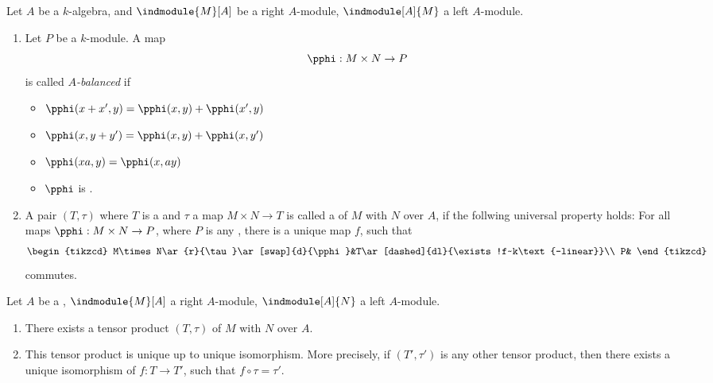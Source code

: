 \begin{defn}
  Let $A$ be a $k$-algebra, and $\indmodule{M}[A]$ be a right $A$-module, $\indmodule[A]{M}$ a left $A$-module.
  \begin{enumerate}
    \item Let $P$ be a $k$-module. A map
    \[
    \pphi: M\times N\to P
    \]
    is called \emph{$A$-balanced}  if
    \begin{itemize}
      \item $\pphi(x+x',y)=\pphi(x,y)+\pphi(x',y)$
      \item $\pphi(x,y+y')=\pphi(x,y)+\pphi(x,y')$
      \item $\pphi(xa,y)=\pphi(x,ay)$
      \item $\pphi$ is .
    \end{itemize}
  \item A pair $(T,\tau)$ where $T$ is a  and $\tau$ a  map $M\times N\to T$ is called a  of $M$ with $N$ over $A$, if the follwing universal property holds: For all  maps $\pphi:M\times N\to P$, where $P$ is any , there is a unique  map $f$, such that
  \[
  \begin{tikzcd}
    M\times N\ar{r}{\tau}\ar[swap]{d}{\pphi}&T\ar[dashed]{dl}{\exists!f~k\text{-linear}}\\
    P&
  \end{tikzcd}
  \]
  commutes.
\end{enumerate}
\end{defn}

\begin{lem}
  Let $A$ be a , $\indmodule{M}[A]$ a right $A$-module, $\indmodule[A]{N}$ a left $A$-module.
  \begin{enumerate}
    \item There exists a tensor product $(T,\tau)$ of $M$ with $N$ over $A$.
    \item This tensor product is unique up to unique isomorphism. More precisely, if $(T',\tau')$ is any other tensor product, then there exists a unique isomorphism of  $f:T\to T'$, such that $f\circ \tau = \tau'$.
  \end{enumerate}
\end{lem}

